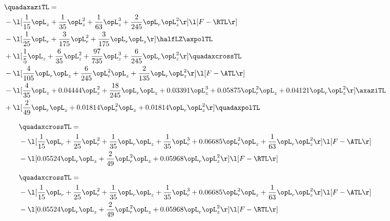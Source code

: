 \begin{alignat}{2} 
\label{eq:quadaxaziTL_1} 
& \quadaxaziTL = \\ 
& - \l[ \frac{1}{15} \opL_z + \frac{1}{35} \opL_z^{2} + \frac{1}{63} \opL_z^{3} + \frac{2}{245} \opL_r \opL_z^{2}  \r] \l[ F - \RTL \r] \nonumber \\ 
& - \l[ \frac{1}{25} \opL_r + \frac{3}{175} \opL_r^{2} + \frac{3}{175} \opL_r \opL_z  \r] \halfLZ \axpolTL \nonumber \\ 
& + \l[ \frac{1}{5} \opL_z + \frac{6}{35} \opL_z^{2} + \frac{97}{735} \opL_z^{3} + \frac{6}{245} \opL_r \opL_z^{2}  \r] \quadaxcrossTL \nonumber \\ 
& - \l[ \frac{4}{105} \opL_r \opL_z + \frac{6}{245} \opL_r^{2} \opL_z + \frac{2}{135} \opL_r \opL_z^{2}  \r] \l[ F - \ATL \r] \nonumber \\ 
& - \l[ \frac{4}{35} \opL_z +  0.04444 \opL_z^{2} + \frac{18}{245} \opL_r \opL_z +  0.03391 \opL_z^{3} +  0.05875 \opL_r^{2} \opL_z +  0.04121 \opL_r \opL_z^{2}  \r] \axaziTL \nonumber \\ 
& + \l[ \frac{2}{49} \opL_r \opL_z +  0.01814 \opL_r^{2} \opL_z +  0.01814 \opL_r \opL_z^{2}  \r] \quadaxpolTL \nonumber \\ 
\end{alignat} 


\begin{alignat}{2} 
\label{eq:quadaxcrossTL_2} 
& \quadaxcrossTL = \\ 
& - \l[ \frac{1}{15} \opL_r + \frac{1}{25} \opL_r^{2} + \frac{1}{35} \opL_r \opL_z + \frac{1}{35} \opL_r^{3} +  0.06685 \opL_r^{2} \opL_z + \frac{1}{63} \opL_r \opL_z^{2}  \r] \l[ F - \ATL \r] \nonumber \\ 
& - \l[  0.05524 \opL_r \opL_z + \frac{2}{49} \opL_r^{2} \opL_z +  0.05968 \opL_r \opL_z^{2}  \r] \l[ F - \RTL \r] \nonumber \\ 
\end{alignat} 


\begin{alignat}{2} 
\label{eq:quadaxcrossTL_3} 
& \quadaxcrossTL = \\ 
& - \l[ \frac{1}{15} \opL_r + \frac{1}{25} \opL_r^{2} + \frac{1}{35} \opL_r \opL_z + \frac{1}{35} \opL_r^{3} +  0.06685 \opL_r^{2} \opL_z + \frac{1}{63} \opL_r \opL_z^{2}  \r] \l[ F - \ATL \r] \nonumber \\ 
& - \l[  0.05524 \opL_r \opL_z + \frac{2}{49} \opL_r^{2} \opL_z +  0.05968 \opL_r \opL_z^{2}  \r] \l[ F - \RTL \r] \nonumber \\ 
\end{alignat} 


